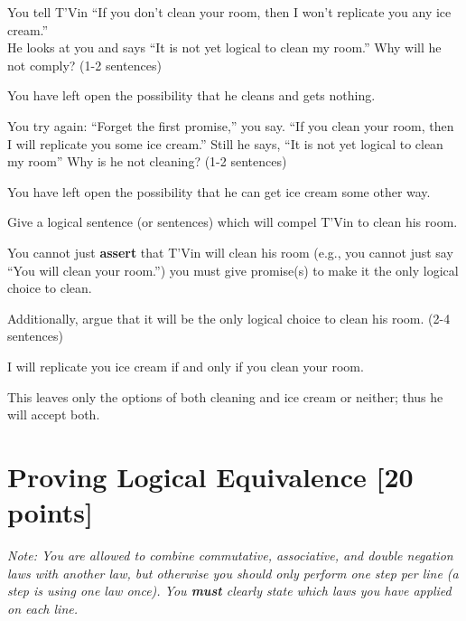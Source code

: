\documentclass[homework, problems]{../../latex-common/cs151-common}
\begin{document}
\begin{enumeratequestions}
	\item You tell T'Vin ``If you don't clean your room, then I won't replicate you any ice cream.''\\
	He looks at you and says ``It is not yet logical to clean my room.'' Why will he not comply? (1-2 sentences) 
    
    \begin{solution}
    You have left open the possibility that he cleans and gets nothing.
	\end{solution}	
		
    \item You try again: ``Forget the first promise,'' you say. ``If you clean your room, then I will replicate you some ice cream.'' Still he says, ``It is not yet logical to clean my room'' Why is he not cleaning? (1-2 sentences)
    
	\begin{solution}
	You have left open the possibility that he can get ice cream some other way. 
	\end{solution}

    \item Give a logical sentence (or sentences) which will compel T'Vin to clean his room.
   
    You cannot just \textbf{assert} that T'Vin will clean his room (e.g., you cannot just say ``You will clean your room.'') you must give promise(s) to make it the only logical choice to clean. 
   
    Additionally, argue that it will be the only logical choice to clean his room. (2-4 sentences)\\
    
	\begin{solution}
		I will replicate you ice cream if and only if you clean your room. 
			
		This leaves only the options of both cleaning and ice cream or neither; thus he will accept both. 
	\end{solution}
\end{enumeratequestions}

\problemnewpage
\section{Proving Logical Equivalence \hfill [20 points]}
\begin{problemsonly}
\textit{Note: You are allowed to combine commutative, associative, and double negation laws with another law, but otherwise you should only perform one step per line (a step is using one law once). You \textbf{must} clearly state which laws you have applied on each line.}
\end{problemsonly}
\end{document}
